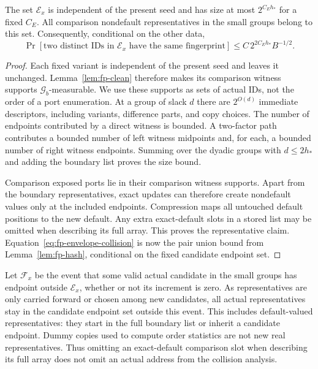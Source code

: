 \begin{lemma}
\label{lem:fp-envelope}
The set $\mathcal E_x$ is independent of the present seed and has size at
most $2^{C_Eh_*}$ for a fixed $C_E$.  All comparison nondefault representatives
in the small groups belong to this set.  Consequently, conditional on
the other data,
\begin{equation}
 \Pr[\text{two distinct IDs in $\mathcal E_x$ have the same fingerprint}]
 \le C\,2^{2C_Eh_*}B^{-1/2}.
 \label{eq:fp-envelope-collision}
\end{equation}
\end{lemma}

\begin{proof}
Each fixed variant is independent of the present seed and leaves it
unchanged.  Lemma~\ref{lem:fp-clean} therefore makes its comparison witness
supports $\mathcal G_b$-measurable.  We use these supports as sets of
actual IDs, not the order of a port enumeration.  At a group of slack
$d$ there are $2^{O(d)}$ immediate descriptors, including variants,
difference parts, and copy choices.  The number of endpoints contributed by a direct
witness is bounded.  A two-factor path contributes a bounded number of
left witness midpoints and, for each, a bounded number of right witness
endpoints.  Summing over the dyadic groups with $d\le2h_*$ and adding the
boundary list proves the size bound.

Comparison exposed ports lie in their comparison witness supports.  Apart from the
boundary representatives, exact updates can therefore create nondefault
values only at the included endpoints.  Compression maps all untouched
default positions to the new default.  Any extra exact-default slots in
a stored list may be omitted when describing its full array.  This proves
the representative claim.  Equation~\eqref{eq:fp-envelope-collision}
is now the pair union bound from Lemma~\ref{lem:fp-hash}, conditional on
the fixed candidate endpoint set.
\end{proof}

Let $\mathcal F_x$ be the event that some valid actual candidate in the
small groups has endpoint outside $\mathcal E_x$, whether or not its
increment is zero.  As representatives are
only carried forward or chosen among new candidates, all actual
representatives stay in the candidate endpoint set outside this event.
This includes default-valued representatives: they start in the full
boundary list or inherit a candidate endpoint.  Dummy copies used to
compute order statistics are not new real representatives.  Thus omitting an
exact-default comparison slot when describing its full array does not omit
an actual address from the collision analysis.

